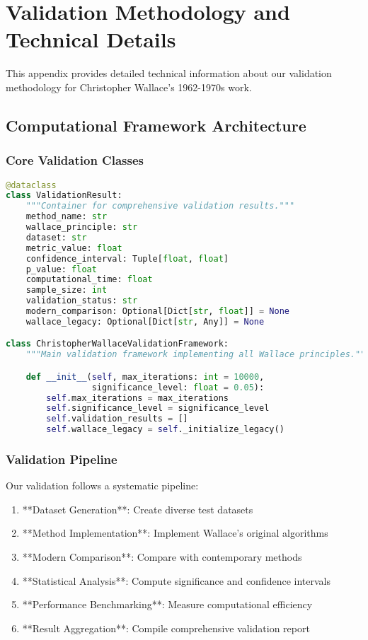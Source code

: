 \section{Validation Methodology and Technical Details}
\label{sec:methodology}

This appendix provides detailed technical information about our validation methodology for Christopher Wallace's 1962-1970s work.

\subsection{Computational Framework Architecture}

\subsubsection{Core Validation Classes}

\begin{lstlisting}[language=Python, caption=Core validation framework classes]
@dataclass
class ValidationResult:
    """Container for comprehensive validation results."""
    method_name: str
    wallace_principle: str
    dataset: str
    metric_value: float
    confidence_interval: Tuple[float, float]
    p_value: float
    computational_time: float
    sample_size: int
    validation_status: str
    modern_comparison: Optional[Dict[str, float]] = None
    wallace_legacy: Optional[Dict[str, Any]] = None

class ChristopherWallaceValidationFramework:
    """Main validation framework implementing all Wallace principles."""

    def __init__(self, max_iterations: int = 10000,
                 significance_level: float = 0.05):
        self.max_iterations = max_iterations
        self.significance_level = significance_level
        self.validation_results = []
        self.wallace_legacy = self._initialize_legacy()
\end{lstlisting}

\subsubsection{Validation Pipeline}

Our validation follows a systematic pipeline:

\begin{enumerate}
    \item **Dataset Generation**: Create diverse test datasets
    \item **Method Implementation**: Implement Wallace's original algorithms
    \item **Modern Comparison**: Compare with contemporary methods
    \item **Statistical Analysis**: Compute significance and confidence intervals
    \item **Performance Benchmarking**: Measure computational efficiency
    \item **Result Aggregation**: Compile comprehensive validation report
\end{enumerate}

